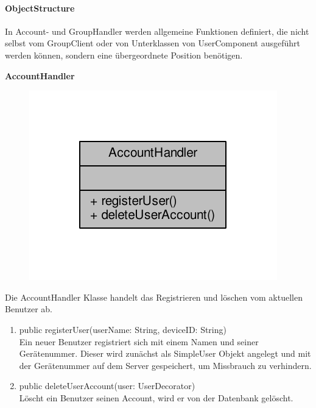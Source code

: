 \paragraph{ObjectStructure}

In Account- und GroupHandler werden allgemeine Funktionen definiert, die nicht selbst vom GroupClient oder von Unterklassen von UserComponent ausgeführt werden können, sondern eine übergeordnete Position benötigen.

\textbf{AccountHandler}
\begin{figure}[H]
	\includegraphics[scale = 1]{res/umlClasses/account_handler__coll__graph.pdf}
	\centering
\end{figure}
Die AccountHandler Klasse handelt das Registrieren und löschen vom aktuellen Benutzer ab.
\begin{enumerate}
	\item public registerUser(userName: String, deviceID: String)\\
		Ein neuer Benutzer registriert sich mit einem Namen und seiner Gerätenummer. Dieser wird zunächst als SimpleUser Objekt angelegt und mit der Gerätenummer auf dem Server gespeichert, um Missbrauch zu verhindern.
	\item public deleteUserAccount(user: UserDecorator)\\
		Löscht ein Benutzer seinen Account, wird er von der Datenbank gelöscht.
\end{enumerate}

